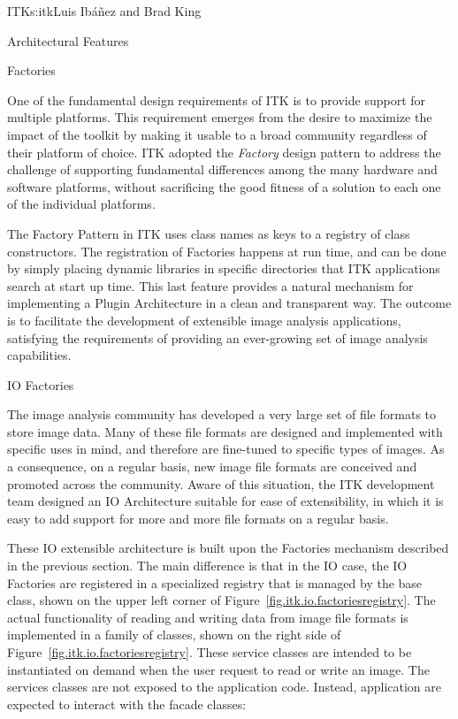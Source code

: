 \begin{aosachapter}{ITK}{s:itk}{Luis Ib\'{a}\~{n}ez and Brad King}
\begin{aosasect1}{Architectural Features}
\begin{aosasect2}{Factories}

One of the fundamental design requirements of ITK is to provide support for
multiple platforms. This requirement emerges from the desire to maximize the
impact of the toolkit by making it usable to a broad community regardless of
their platform of choice. ITK adopted the \emph{Factory} design pattern to
address the challenge of supporting fundamental differences among the many
hardware and software platforms, without sacrificing the good fitness of a
solution to each one of the individual platforms.

The Factory Pattern in ITK uses class names as keys to a registry of class
constructors. The registration of Factories happens at run time, and can be
done by simply placing dynamic libraries in specific directories that ITK
applications search at start up time. This last feature provides a natural
mechanism for implementing a Plugin Architecture in a clean and transparent
way. The outcome is to facilitate the development of extensible image analysis
applications, satisfying the requirements of providing an ever-growing set of
image analysis capabilities.

\end{aosasect2}

\begin{aosasect2}{IO Factories}

The image analysis community has developed a very large set of file formats to
store image data. Many of these file formats are designed and implemented with
specific uses in mind, and therefore are fine-tuned to specific types of
images. As a consequence, on a regular basis, new image file formats are
conceived and promoted across the community. Aware of this situation, the ITK
development team designed an IO Architecture suitable for ease of
extensibility, in which it is easy to add support for more and more file
formats on a regular basis.


These IO extensible architecture is built upon the Factories mechanism
described in the previous section. The main difference is that in the IO case,
the IO Factories are registered in a specialized registry that is managed by
the  base class, shown on the upper left corner of
Figure~\ref{fig.itk.io.factoriesregistry}. The actual functionality of reading
and writing data from image file formats is implemented in a family of
 classes, shown on the right side of
Figure~\ref{fig.itk.io.factoriesregistry}. These service classes are intended
to be instantiated on demand when the user request to read or write an image.
The services classes are not exposed to the application code. Instead,
application are expected to interact with the facade classes:


\end{aosasect2}
\end{aosasect1}
\end{aosachapter}
